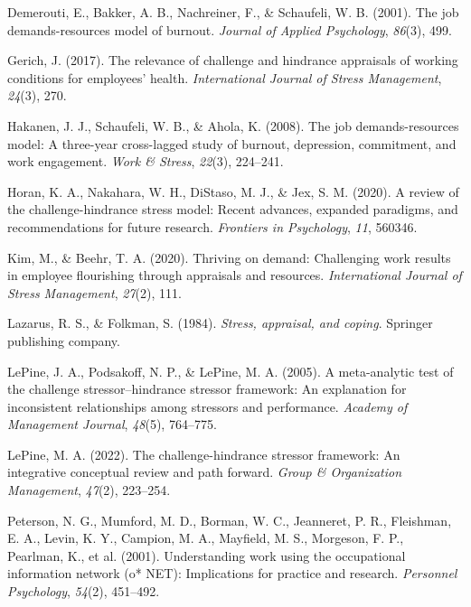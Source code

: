 \documentclass[
  man,mask]{apa7}
\newlength{\cslhangindent}
\newlength{\cslentryspacingunit} %
\newenvironment{CSLReferences}[2] %
 {%
  \setlength{\parindent}{0pt}
  \ifodd #1
  \let\oldpar\par
  \def\par{\hangindent=\cslhangindent\oldpar}
  \fi
  \setlength{\parskip}{#2\cslentryspacingunit}
 }%
 {}
\begin{document}
\begin{CSLReferences}{1}{0}
\leavevmode{}%
Demerouti, E., Bakker, A. B., Nachreiner, F., \& Schaufeli, W. B. (2001). The job demands-resources model of burnout. \emph{Journal of Applied Psychology}, \emph{86}(3), 499.

\leavevmode{}%
Gerich, J. (2017). The relevance of challenge and hindrance appraisals of working conditions for employees' health. \emph{International Journal of Stress Management}, \emph{24}(3), 270.

\leavevmode{}%
Hakanen, J. J., Schaufeli, W. B., \& Ahola, K. (2008). The job demands-resources model: A three-year cross-lagged study of burnout, depression, commitment, and work engagement. \emph{Work \& Stress}, \emph{22}(3), 224--241.

\leavevmode{}%
Horan, K. A., Nakahara, W. H., DiStaso, M. J., \& Jex, S. M. (2020). A review of the challenge-hindrance stress model: Recent advances, expanded paradigms, and recommendations for future research. \emph{Frontiers in Psychology}, \emph{11}, 560346.

\leavevmode{}%
Kim, M., \& Beehr, T. A. (2020). Thriving on demand: Challenging work results in employee flourishing through appraisals and resources. \emph{International Journal of Stress Management}, \emph{27}(2), 111.

\leavevmode{}%
Lazarus, R. S., \& Folkman, S. (1984). \emph{Stress, appraisal, and coping}. Springer publishing company.

\leavevmode{}%
LePine, J. A., Podsakoff, N. P., \& LePine, M. A. (2005). A meta-analytic test of the challenge stressor--hindrance stressor framework: An explanation for inconsistent relationships among stressors and performance. \emph{Academy of Management Journal}, \emph{48}(5), 764--775.

\leavevmode{}%
LePine, M. A. (2022). The challenge-hindrance stressor framework: An integrative conceptual review and path forward. \emph{Group \& Organization Management}, \emph{47}(2), 223--254.

\leavevmode{}%
Peterson, N. G., Mumford, M. D., Borman, W. C., Jeanneret, P. R., Fleishman, E. A., Levin, K. Y., Campion, M. A., Mayfield, M. S., Morgeson, F. P., Pearlman, K., et al. (2001). Understanding work using the occupational information network (o* NET): Implications for practice and research. \emph{Personnel Psychology}, \emph{54}(2), 451--492.


\end{CSLReferences}
\end{document}
